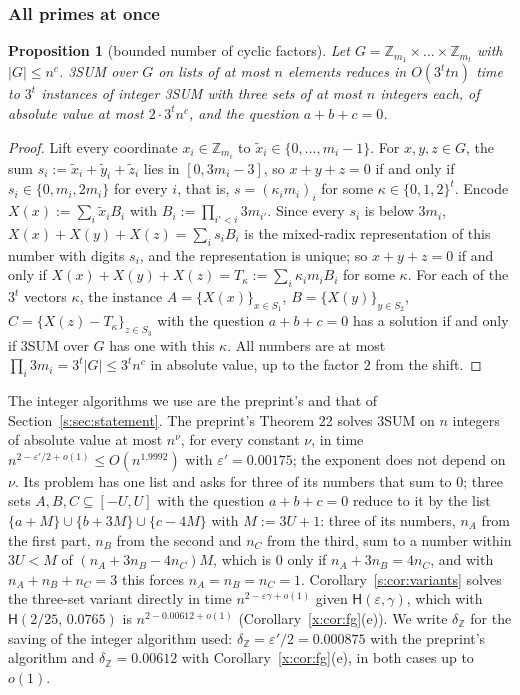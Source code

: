 \documentclass[11pt]{article}
\newtheorem{proposition}[theorem]{Proposition}
\theoremstyle{definition}
\theoremstyle{remark}
\newcommand{\Z}{\mathbb{Z}}
\newcommand{\eps}{\varepsilon}
\newcommand{\Hyp}{\mathsf{H}}
\newcommand{\EpsGammaBest}{0.00612}%
\newcommand{\HypPrunedEps}{2/25}%
\newcommand{\HypPrunedGamma}{0.0765}%
\begin{document}
\subsubsection{All primes at once}

\begin{proposition}[bounded number of cyclic factors]\label{g:prop:boundedrank}
Let $G=\Z_{m_1}\times\dots\times\Z_{m_t}$ with $|G|\le n^c$. 3SUM over $G$ on lists of at most $n$ elements reduces in $O(3^ttn)$ time to $3^t$ instances of integer 3SUM with three sets of at most $n$ integers each, of absolute value at most $2\cdot3^tn^c$, and the question $a+b+c=0$.
\end{proposition}
\begin{proof}
Lift every coordinate $x_i\in\Z_{m_i}$ to $\tilde x_i\in\{0,\dots,m_i-1\}$. For $x,y,z\in G$, the sum $s_i:=\tilde x_i+\tilde y_i+\tilde z_i$ lies in $[0,3m_i-3]$, so $x+y+z=0$ if and only if $s_i\in\{0,m_i,2m_i\}$ for every $i$, that is, $s=(\kappa_im_i)_i$ for some $\kappa\in\{0,1,2\}^t$. Encode $X(x):=\sum_i\tilde x_iB_i$ with $B_i:=\prod_{i'<i}3m_{i'}$. Since every $s_i$ is below $3m_i$, $X(x)+X(y)+X(z)=\sum_is_iB_i$ is the mixed-radix representation of this number with digits $s_i$, and the representation is unique; so $x+y+z=0$ if and only if $X(x)+X(y)+X(z)=T_\kappa:=\sum_i\kappa_im_iB_i$ for some $\kappa$. For each of the $3^t$ vectors $\kappa$, the instance $A=\{X(x)\}_{x\in S_1}$, $B=\{X(y)\}_{y\in S_2}$, $C=\{X(z)-T_\kappa\}_{z\in S_3}$ with the question $a+b+c=0$ has a solution if and only if 3SUM over $G$ has one with this $\kappa$. All numbers are at most $\prod_i3m_i=3^t|G|\le3^tn^c$ in absolute value, up to the factor $2$ from the shift.
\end{proof}

The integer algorithms we use are the preprint's and that of Section~\ref{s:sec:statement}. The preprint's Theorem 22 solves 3SUM on $n$ integers of absolute value at most $n^\nu$, for every constant $\nu$, in time $n^{2-\eps'/2+o(1)}\le O(n^{1.9992})$ with $\eps'=0.00175$; the exponent does not depend on $\nu$. Its problem has one list and asks for three of its numbers that sum to $0$; three sets $A,B,C\subseteq[-U,U]$ with the question $a+b+c=0$ reduce to it by the list $\{a+M\}\cup\{b+3M\}\cup\{c-4M\}$ with $M:=3U+1$: three of its numbers, $n_A$ from the first part, $n_B$ from the second and $n_C$ from the third, sum to a number within $3U<M$ of $(n_A+3n_B-4n_C)M$, which is $0$ only if $n_A+3n_B=4n_C$, and with $n_A+n_B+n_C=3$ this forces $n_A=n_B=n_C=1$. Corollary~\ref{s:cor:variants} solves the three-set variant directly in time $n^{2-\eps\gamma+o(1)}$ given $\Hyp(\eps,\gamma)$, which with $\Hyp(\HypPrunedEps,\,\HypPrunedGamma)$ is $n^{2-\EpsGammaBest+o(1)}$ (Corollary~\ref{x:cor:fg}(e)). We write $\delta_\Z$ for the saving of the integer algorithm used: $\delta_\Z=\eps'/2=0.000875$ with the preprint's algorithm and $\delta_\Z=\EpsGammaBest$ with Corollary~\ref{x:cor:fg}(e), in both cases up to $o(1)$.
\end{document}
